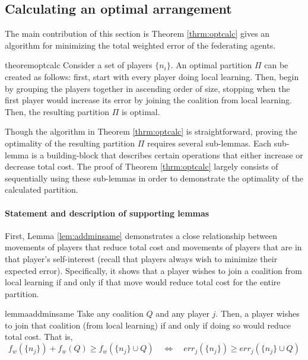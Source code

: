 \documentclass{article}
\newcommand{\ndraw}[0]{\ensuremath{n}}
\newcommand{\costw}[0]{\ensuremath{f_w}}
\newcommand{\partition}[0]{\ensuremath{\Pi}}
\begin{document}
\subsection{Calculating an optimal arrangement}

The main contribution of this section is Theorem \ref{thrm:optcalc} gives an algorithm for minimizing the total weighted error of the federating agents. 

\begin{restatable}{theorem}{optcalc}
\label{thrm:optcalc}
Consider a set of players $\{\ndraw_i\}$. An optimal partition $\partition$ can be created as follows: first, start with every player doing local learning. Then, begin by grouping the players together in ascending order of size, stopping when the first player would increase its error by joining the coalition from local learning. Then, the resulting partition $\partition$ is optimal.
\end{restatable}

Though the algorithm in Theorem \ref{thrm:optcalc} is straightforward, proving the optimality of the resulting partition $\partition$ requires several sub-lemmas. Each sub-lemma is a building-block that describes certain operations that either increase or decrease total cost. The proof of Theorem \ref{thrm:optcalc} largely consists of sequentially using these sub-lemmas in order to demonstrate the optimality of the calculated partition.

\paragraph{\bf Statement and description of supporting lemmas} First, Lemma \ref{lem:addminsame} demonstrates a close relationship between movements of players that reduce total cost and movements of players that are in that player's self-interest (recall that players always wish to minimize their expected error). Specifically, it shows that a player wishes to join a coalition from local learning if and only if that move would reduce total cost for the entire partition. 

\begin{restatable}{lemma}{addminsame}
\label{lem:addminsame}
Take any coalition $Q$ and any player $j$. Then, a player wishes to join that coalition (from local learning) if and only if doing so would reduce total cost. That is, 
$$\costw(\{\ndraw_j\}) + \costw(Q) \geq \costw(\{\ndraw_j\} \cup Q) \quad \Leftrightarrow \quad err_j(\{\ndraw_j\}) \geq err_j(\{\ndraw_j\} \cup Q)$$
\end{restatable}
\end{document}
